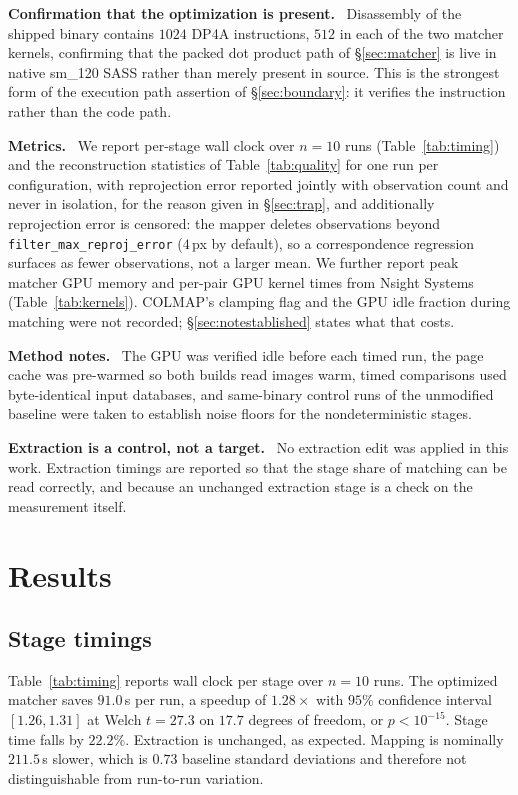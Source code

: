 \documentclass[conference]{IEEEtran}
\newcommand{\para}[1]{\smallskip\noindent\textbf{#1}\ }
\newcommand{\opt}[1]{\texttt{#1}}
\begin{document}
\para{Confirmation that the optimization is present.} Disassembly of the
shipped binary contains $1024$ DP4A instructions, $512$ in each of the two
matcher kernels, confirming that the packed dot product path of
\S\ref{sec:matcher} is live in native sm\_120 SASS rather than merely present
in source. This is the strongest form of the execution path assertion of
\S\ref{sec:boundary}: it verifies the instruction rather than the code path.

\para{Metrics.} We report per-stage wall clock over $n = 10$ runs
(Table~\ref{tab:timing}) and the reconstruction statistics of
Table~\ref{tab:quality} for one run per configuration, with reprojection error
reported jointly with observation count and never in isolation, for the reason
given in \S\ref{sec:trap}, and additionally reprojection error is censored:
the mapper deletes observations beyond \opt{filter\_max\_reproj\_error}
($4$\,px by default), so a correspondence regression surfaces as fewer
observations, not a larger mean. We further report peak matcher GPU memory and
per-pair GPU kernel times from Nsight Systems (Table~\ref{tab:kernels}).
COLMAP's clamping flag and the GPU idle fraction during matching were not
recorded; \S\ref{sec:notestablished} states what that costs.

\para{Method notes.} The GPU was verified idle before each timed run, the page
cache was pre-warmed so both builds read images warm, timed comparisons used
byte-identical input databases, and same-binary control runs of the unmodified
baseline were taken to establish noise floors for the nondeterministic stages.

\para{Extraction is a control, not a target.} No extraction edit was applied in
this work. Extraction timings are reported so that the stage share of matching
can be read correctly, and because an unchanged extraction stage is a check on
the measurement itself.


\section{Results}
\label{sec:results}

\subsection{Stage timings}

Table~\ref{tab:timing} reports wall clock per stage over $n = 10$ runs. The
optimized matcher saves $91.0$\,s per run, a speedup of $1.28\times$ with $95\%$
confidence interval $[1.26, 1.31]$ at Welch $t = 27.3$ on $17.7$ degrees of
freedom, or $p < 10^{-15}$. Stage time falls by $22.2\%$. Extraction is
unchanged, as expected. Mapping is nominally $211.5$\,s slower, which is $0.73$
baseline standard deviations and therefore not distinguishable from run-to-run
variation.
\end{document}
